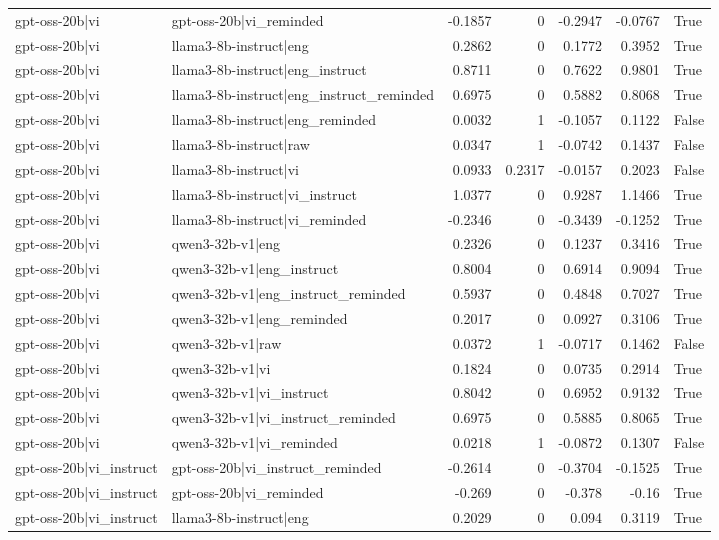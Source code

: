\begin{table}
\begin{tabular}{l l r r r r l}
gpt-oss-20b|vi & gpt-oss-20b|vi_reminded & -0.1857 & 0 & -0.2947 & -0.0767 & True \\
gpt-oss-20b|vi & llama3-8b-instruct|eng & 0.2862 & 0 & 0.1772 & 0.3952 & True \\
gpt-oss-20b|vi & llama3-8b-instruct|eng_instruct & 0.8711 & 0 & 0.7622 & 0.9801 & True \\
gpt-oss-20b|vi & llama3-8b-instruct|eng_instruct_reminded & 0.6975 & 0 & 0.5882 & 0.8068 & True \\
gpt-oss-20b|vi & llama3-8b-instruct|eng_reminded & 0.0032 & 1 & -0.1057 & 0.1122 & False \\
gpt-oss-20b|vi & llama3-8b-instruct|raw & 0.0347 & 1 & -0.0742 & 0.1437 & False \\
gpt-oss-20b|vi & llama3-8b-instruct|vi & 0.0933 & 0.2317 & -0.0157 & 0.2023 & False \\
gpt-oss-20b|vi & llama3-8b-instruct|vi_instruct & 1.0377 & 0 & 0.9287 & 1.1466 & True \\
gpt-oss-20b|vi & llama3-8b-instruct|vi_reminded & -0.2346 & 0 & -0.3439 & -0.1252 & True \\
gpt-oss-20b|vi & qwen3-32b-v1|eng & 0.2326 & 0 & 0.1237 & 0.3416 & True \\
gpt-oss-20b|vi & qwen3-32b-v1|eng_instruct & 0.8004 & 0 & 0.6914 & 0.9094 & True \\
gpt-oss-20b|vi & qwen3-32b-v1|eng_instruct_reminded & 0.5937 & 0 & 0.4848 & 0.7027 & True \\
gpt-oss-20b|vi & qwen3-32b-v1|eng_reminded & 0.2017 & 0 & 0.0927 & 0.3106 & True \\
gpt-oss-20b|vi & qwen3-32b-v1|raw & 0.0372 & 1 & -0.0717 & 0.1462 & False \\
gpt-oss-20b|vi & qwen3-32b-v1|vi & 0.1824 & 0 & 0.0735 & 0.2914 & True \\
gpt-oss-20b|vi & qwen3-32b-v1|vi_instruct & 0.8042 & 0 & 0.6952 & 0.9132 & True \\
gpt-oss-20b|vi & qwen3-32b-v1|vi_instruct_reminded & 0.6975 & 0 & 0.5885 & 0.8065 & True \\
gpt-oss-20b|vi & qwen3-32b-v1|vi_reminded & 0.0218 & 1 & -0.0872 & 0.1307 & False \\
gpt-oss-20b|vi_instruct & gpt-oss-20b|vi_instruct_reminded & -0.2614 & 0 & -0.3704 & -0.1525 & True \\
gpt-oss-20b|vi_instruct & gpt-oss-20b|vi_reminded & -0.269 & 0 & -0.378 & -0.16 & True \\
gpt-oss-20b|vi_instruct & llama3-8b-instruct|eng & 0.2029 & 0 & 0.094 & 0.3119 & True \\

\end{tabular}
\end{table}
